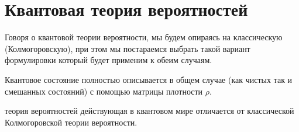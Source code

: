 \section{Квантовая теория вероятностей}

Говоря о квантовой теории вероятности, мы будем опираясь на классическую
(Колмогоровскую), при этом мы постараемся выбрать такой вариант
формулировки который будет применим к обеим случаям. 

Квантовое состояние полностью описывается в общем случае (как чистых
так и смешанных состояний) с помощью матрицы плотности $\rho$. 

теория вероятностей действующая в квантовом мире отличается от
классической Колмогоровской теории вероятности.
